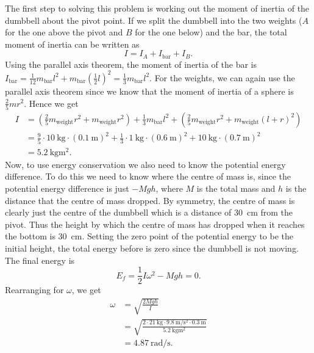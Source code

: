 \documentclass[../classical_mechanics.tex]{subfiles}
\begin{document}
\begin{example}
            The first step to solving this problem is working out the moment of inertia of the dumbbell about the pivot point.
            If we split the dumbbell into the two weights ($A$ for the one above the pivot and $B$ for the one below) and the bar, the total moment of inertia can be written as
            \begin{equation}
                I=I_A+I_\text{bar}+I_B.
            \end{equation}
            Using the parallel axis theorem, the moment of inertia of the bar is $I_\text{bar}=\frac{1}{12}m_\text{bar}l^2+m_\text{bar}\left(\frac{1}{2}l\right)^2=\frac{1}{3}m_\text{bar}l^2$.
            For the weights, we can again use the parallel axis theorem since we know that the moment of inertia of a sphere is $\frac{2}{5}mr^2$.
            Hence we get
            \begin{align}
                I&=\left(\frac{2}{5}m_\text{weight}r^2+m_\text{weight}r^2\right)+\frac{1}{3}m_\text{bar}l^2+\left(\frac{2}{5}m_\text{weight}r^2+m_\text{weight}(l+r)^2\right)\\
                &=\frac{9}{5}\cdot\qty{10}{\kilogram}\cdot(\qty{0.1}{\meter})^2+\frac{1}{3}\cdot\qty{1}{\kilogram}\cdot(\qty{0.6}{\meter})^2+\qty{10}{\kilogram}\cdot(\qty{0.7}{\meter})^2\\
                &=\qty{5.2}{\kilogram\meter\squared}.
            \end{align}
            Now, to use energy conservation we also need to know the potential energy difference.
            To do this we need to know where the centre of mass is, since the potential energy difference is just $-Mgh$, where $M$ is the total mass and $h$ is the distance that the centre of mass dropped.
            By symmetry, the centre of mass is clearly just the centre of the dumbbell which is a distance of \qty{30}{\centi\meter} from the pivot.
            Thus the height by which the centre of mass has dropped when it reaches the bottom is \qty{30}{\centi\meter}.
            Setting the zero point of the potential energy to be the initial height, the total energy before is zero since the dumbbell is not moving.
            The final energy is
            \begin{equation}
                E_f=\frac{1}{2}I\omega^2-Mgh=0.
            \end{equation}
            Rearranging for $\omega$, we get
            \begin{align}
                \omega&=\sqrt{\frac{2Mgh}{I}}\\
                &=\sqrt{\frac{2\cdot\qty{21}{\kilogram}\cdot\qty{9.8}{\meter\per\second\squared}\cdot\qty{0.3}{\meter}}{\qty{5.2}{\kilogram\meter\squared}}}\\
                &=\qty{4.87}{\radian\per\second}.
            \end{align}
        \end{example}
\end{document}
